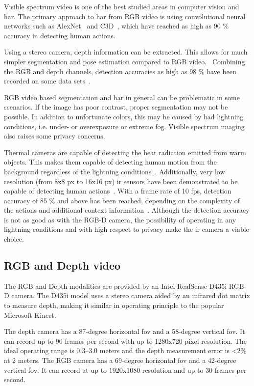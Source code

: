 Visible spectrum video is one of the best studied areas in computer vision and \gls{har}.
The primary approach to \gls{har} from RGB video is using convolutional neural networks
such as AlexNet~\cite{alexnet} and C3D~\cite{c3d},
which have reached as high as 90 \% accuracy in detecting human actions. 

Using a stereo camera, depth information can be extracted.
This allows for much simpler segmentation and pose estimation
compared to RGB video.~\cite{sensing-survey}
Combining the RGB and depth channels,
detection accuracies as high as 98 \% have been recorded on some data sets~\cite{cippitelli16}.

RGB video based segmentation and \gls{har} in general can be problematic in some scenarios.
If the image has poor contrast, proper segmentation may not be possible.
In addition to unfortunate colors,
this may be caused by bad lightning conditions, i.e. under- or overexposure or extreme fog.
Visible spectrum imaging also raises some privacy concerns.

Thermal cameras are capable of detecting the heat radiation emitted from warm objects.
This makes them capable of detecting human motion from the background regardless of the lightning conditions~\cite{han05}.
Additionally, very low resolution (from 8x8 px to 16x16 px) \gls{ir} sensors
have been demonstrated to be capable of detecting human actions~\cite{10.1145/2632048.2636084}.
With a frame rate of 10 fps, detection accuracy of 85 \% and above has been reached,
depending on the complexity of the actions and additional context information~\cite{sensing-survey, tao18}.
Although the detection accuracy is not as good as with the RGB-D camera,
the possibility of operating in any lightning conditions and with high respect to privacy
make the \gls{ir} camera a viable choice.

\subsection{RGB and Depth video}
The RGB and Depth modalities are provided by an Intel RealSense D435i RGB-D camera.
The D435i model uses a stereo camera aided by an infrared dot matrix to measure depth,
making it similar in operating principle to the popular Microsoft Kinect.

The depth camera has a 87-degree horizontal \gls{fov} and a 58-degree vertical \gls{fov}.
It can record up to 90 frames per second with up to 1280x720 pixel resolution.
The ideal operating range is 0.3--3.0 meters and the depth measurement error is <2\% at 2 meters.
The RGB camera has a 69-degree horizontal \gls{fov} and a 42-degree vertical \gls{fov}.
It can record at up to 1920x1080 resolution and up to 30 frames per second.~\cite{realsense-datasheet}

